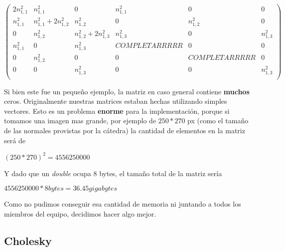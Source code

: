 \[
\begin{pmatrix}
    2 n_{1,1}^{2}&  n_{1,1}^{2}   &  0        & n_{1,1}^{2}   & 0         & 0            \\[10pt]

    n_{1,1}^{2}&  n_{1,1}^{2} +  2 n_{1,2}^{2}   &  n_{1,2}^{2}        & 0     & n_{1,2}^{2}         & 0            \\[10pt]

    0          &  n_{1,2}^{2}  &  n_{1,2}^{2} + 2n_{1,3}^{2} & n_{1,3}^{2}   & 0  & n_{1,3}^{2}            \\[10pt]

    n_{1,1}^{2}&  0            &  n_{1,3}^{2} & COMPLETARRRRR & 0         & 0            \\[10pt]

    0          &   n_{1,2}^{2} & 0           & 0         & COMPLETARRRRR           & 0  \\[10pt]

    0          &              0&  n_{1,3}^{2} & 0         & 0         &   n_{1,3}^{2}           \\[10pt]

\end{pmatrix}
\]


Si bien este fue un pequeño ejemplo, la matriz en caso general contiene \textbf{muchos} ceros. Originalmente nuestras matrices estaban hechas utilizando simples vectores. Esto es un problema \textbf{enorme} para la implementación, porque si tomamos una imagen mas grande, por ejemplo de $250*270$ px (como el tamaño de las normales provistas por la cátedra) la cantidad de elementos en la matriz será de
\begin{center}
    $(250*270)^2 = 4 556 250 000$
\end{center}

Y dado que un \textit{double} ocupa 8 bytes, el tamaño total de la matriz sería
\begin{center}
    $4 556 250 000 * 8 bytes = 36.45 gigabytes$
\end{center}

Como no pudimos conseguir esa cantidad de memoria ni juntando a todos los miembros del equipo, decidimos hacer algo mejor.




\subsection{Cholesky}

